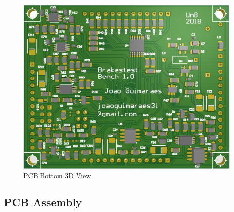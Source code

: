 		\begin{figure}[htbp]
			\centering
			\includegraphics[scale=0.7]{figuras/fig-pcb-print-bottom}
			\caption{PCB Bottom 3D View}
			\label{fig:pcb-print-bottom}
		\end{figure}

	\subsection{PCB Assembly}\label{ssec:pcb-assembly}